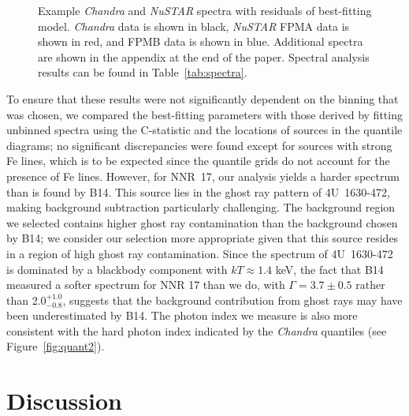 \documentclass[iop,revtex4]{emulateapj}
\begin{document}
\begin{figure*}[t]

	\centering
		
	\centering
\caption{Example \textit{Chandra} and \textit{NuSTAR} spectra with residuals of best-fitting model.  \textit{Chandra} data is shown in black, \textit{NuSTAR} FPMA data is shown in red, and FPMB data is shown in blue.  Additional spectra are shown in the appendix at the end of the paper. Spectral analysis results can be found in Table~\ref{tab:spectra}.}
\label{fig:examplespec}
\end{figure*}
To ensure that these results were not significantly dependent on the binning that was chosen, we compared the best-fitting parameters with those derived by fitting unbinned spectra using the C-statistic and the locations of sources in the quantile diagrams; no significant discrepancies were found except for sources with strong Fe lines, which is to be expected since the quantile grids do not account for the presence of Fe lines.  However, for NNR~17, our analysis yields a harder spectrum than is found by B14.  This source lies in the ghost ray pattern of 4U~1630-472, making background subtraction particularly challenging.  The background region we selected contains higher ghost ray contamination than the background chosen by B14; we consider our selection more appropriate given that this source resides in a region of high ghost ray contamination.  Since the spectrum of 4U~1630-472 is dominated by a blackbody component with $kT\approx1.4$ keV, the fact that B14 measured a softer spectrum for NNR 17 than we do, with $\Gamma=3.7\pm0.5$ rather than 2.0$^{+1.0}_{-0.8}$, suggests that the background contribution from ghost rays may have been underestimated by B14.  The photon index we measure is also more consistent with the hard photon index indicated by the \textit{Chandra} quantiles (see Figure~\ref{fig:quant2}).


\section{Discussion}
\label{sec:discussion}
\end{document}
